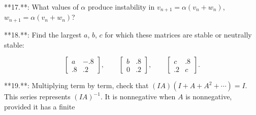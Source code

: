 **17.**: What values of \(\alpha\) produce instability in \(v_{n+1}=\alpha(v_{n}+w_{n})\), \(w_{n+1}=\alpha(v_{n}+w_{n})\)?

**18.**: Find the largest \(a\), \(b\), \(c\) for which these matrices are stable or neutrally stable:

\[\begin{bmatrix}a&-.8\\ .8&.2\end{bmatrix},\qquad\begin{bmatrix}b&.8\\ 0&.2\end{bmatrix},\qquad\begin{bmatrix}c&.8\\ .2&c\end{bmatrix}.\]

**19.**: Multiplying term by term, check that \((IA)(I+A+A^{2}+\cdots)=I\). This series represents \((IA)^{-1}\). It is nonnegative when \(A\) is nonnegative, provided it has a finite 